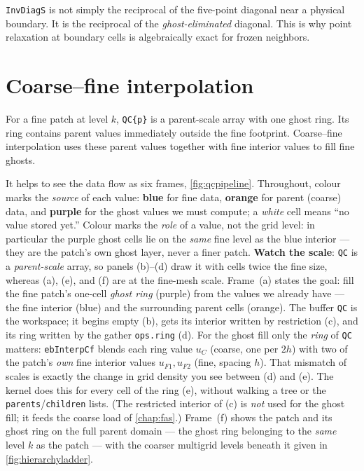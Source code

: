 \documentclass[11pt,oneside,openany]{book}
\newcommand{\code}[1]{\textnormal{\texttt{#1}}}
\begin{document}
\begin{keyidea}
\code{InvDiagS} is not simply the reciprocal of the five-point diagonal near a physical boundary. It is the reciprocal of the \emph{ghost-eliminated} diagonal. This is why point relaxation at boundary cells is algebraically exact for frozen neighbors.
\end{keyidea}

\section{Coarse--fine interpolation}
For a fine patch at level $k$, \code{QC\{p\}} is a parent-scale array with one ghost ring. Its ring contains parent values immediately outside the fine footprint. Coarse--fine interpolation uses these parent values together with fine interior values to fill fine ghosts.

It helps to see the data flow as six frames, \cref{fig:qcpipeline}. Throughout, colour marks the \emph{source} of each value: \textcolor{cbBlue}{\textbf{blue}} for fine data, \textcolor{cbOrange}{\textbf{orange}} for parent (coarse) data, and \textcolor{cbPurple}{\textbf{purple}} for the ghost values we must compute; a \emph{white} cell means ``no value stored yet.'' Colour marks the \emph{role} of a value, not the grid level: in particular the purple ghost cells lie on the \emph{same} fine level as the blue interior --- they are the patch's own ghost layer, never a finer patch. \textbf{Watch the scale}: \code{QC} is a \emph{parent-scale} array, so panels (b)--(d) draw it with cells twice the fine size, whereas (a), (e), and (f) are at the fine-mesh scale. Frame~(a) states the goal: fill the fine patch's one-cell \emph{ghost ring} (purple) from the values we already have --- the fine interior (blue) and the surrounding parent cells (orange). The buffer \code{QC} is the workspace; it begins empty (b), gets its interior written by restriction (c), and its ring written by the gather \code{ops.ring} (d). For the ghost fill only the \emph{ring} of \code{QC} matters: \code{ebInterpCf} blends each ring value $u_C$ (coarse, one per $2h$) with two of the patch's \emph{own} fine interior values $u_{F1},u_{F2}$ (fine, spacing $h$). That mismatch of scales is exactly the change in grid density you see between (d) and (e). The kernel does this for every cell of the ring (e), without walking a tree or the \code{parents}/\code{children} lists. (The restricted interior of (c) is \emph{not} used for the ghost fill; it feeds the coarse load of \cref{chap:fas}.) Frame~(f) shows the patch and its ghost ring on the full parent domain --- the ghost ring belonging to the \emph{same} level $k$ as the patch --- with the coarser multigrid levels beneath it given in \cref{fig:hierarchyladder}.
\end{document}
